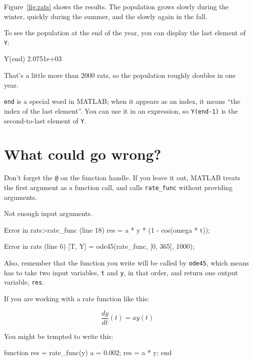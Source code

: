 \documentclass[main.tex]{subfiles}
\begin{document}
Figure~\ref{fig:rats} shows the results.  The population grows slowly during the winter, quickly during the summer, and the slowly again in the fall.


To see the population at the end of the year, you can display the last element of {\tt Y}:

\begin{code}
Y(end)
2.0751e+03
\end{code}

That's a little more than 2000 rats, so the population roughly doubles in one year.

{\tt end} is a special word in MATLAB; when it appears as an index,
it means ``the index of the last element''.  You can use it in an
expression, so {\tt Y(end-1)} is the second-to-last element of
{\tt Y}.



\section{What could go wrong?}

Don't forget the {\tt @} on the function handle.
If you leave it out, MATLAB treats the first argument as a function
call, and calls \verb"rate_func" without providing arguments.


\begin{code}
Not enough input arguments.

Error in rats>rate_func (line 18)
    res = a * y * (1 - cos(omega * t));

Error in rats (line 6)
    [T, Y] = ode45(rate_func, [0, 365], 1000);
\end{code}

Also, remember that the function you write will be called by
{\tt ode45}, which means has to take two input variables, 
{\tt t} and {\tt y}, in that order, and return one output variable, 
{\tt res}.


If you are working with a rate function like this:

\begin{equation}
\frac{dy}{dt}(t) = a y(t)
\end{equation}

You might be tempted to write this:

\begin{code}
function res = rate_func(y)        %
    a = 0.002;
    res = a * y;
end
\end{code}
\end{document}
